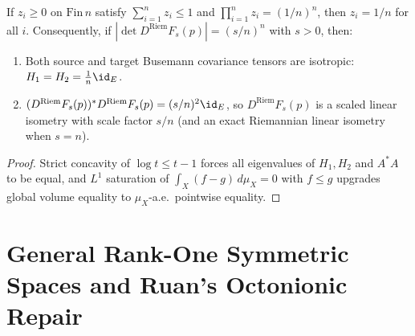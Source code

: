 \begin{theorem}
\label{thm_hyperbolic_rigidity}
\leanok
{}
If $z_i \ge 0$ on $\mathrm{Fin}\,n$ satisfy $\sum_{i=1}^n z_i \le 1$ and $\prod_{i=1}^n z_i = (1/n)^n$, then $z_i = 1/n$ for all $i$. Consequently, if $|\det D^{\mathrm{Riem}} F_s(p)| = (s/n)^n$ with $s > 0$, then:
\begin{enumerate}
\item Both source and target Busemann covariance tensors are isotropic: $H_1 = H_2 = \frac{1}{n} \id_E$.
\item $(D^{\mathrm{Riem}} F_s(p))^* D^{\mathrm{Riem}} F_s(p) = (s/n)^2 \id_E$, so $D^{\mathrm{Riem}} F_s(p)$ is a scaled linear isometry with scale factor $s/n$ (and an exact Riemannian linear isometry when $s = n$).
\end{enumerate}
\end{theorem}
\begin{proof}\leanok Strict concavity of $\log t \le t - 1$ forces all eigenvalues of $H_1, H_2$ and $A^* A$ to be equal, and $L^1$ saturation of $\int_X (f - g)\,d\mu_X = 0$ with $f \le g$ upgrades global volume equality to $\mu_X$-a.e.\ pointwise equality.\end{proof}

\chapter{General Rank-One Symmetric Spaces and Ruan's Octonionic Repair}

